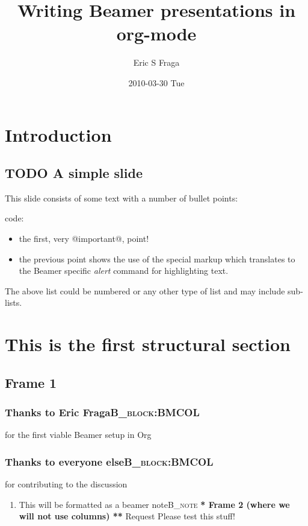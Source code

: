 \documentclass[bigger]{beamer}
\author{Eric S Fraga}
\date{2010-03-30 Tue}
\title{Writing Beamer presentations in org-mode}
\begin{document}
\maketitle
\tableofcontents

\section{Introduction}
\label{sec-1}
\subsection{{\bfseries\sffamily TODO} A simple slide}
\label{sec-1-1}
This slide consists of some text with a number of bullet points:

code: 
\begin{itemize}
\item the first, very @important@, point!
\item the previous point shows the use of the special markup which
translates to the Beamer specific \emph{alert} command for highlighting
text.
\end{itemize}


The above list could be numbered or any other type of list and may
include sub-lists.

\section{This is the first structural section}
\label{sec-2}

\subsection{Frame 1}
\label{sec-2-1}
\subsubsection[Thanks to Eric Fraga]{Thanks to Eric Fraga\hfill{}\textsc{B_block:BMCOL}}
\label{sec-2-1-1}
for the first viable Beamer setup in Org
\subsubsection[Thanks to everyone else]{Thanks to everyone else\hfill{}\textsc{B_block:BMCOL}}
\label{sec-2-1-2}
for contributing to the discussion
\begin{enumerate}
\item This will be formatted as a beamer note\hfill{}\textsc{B_note}
\label{sec-2-1-2-1}
\textbf{* Frame 2 (where we will not use columns)
**} Request
    Please test this stuff!
\end{enumerate}
\end{document}
